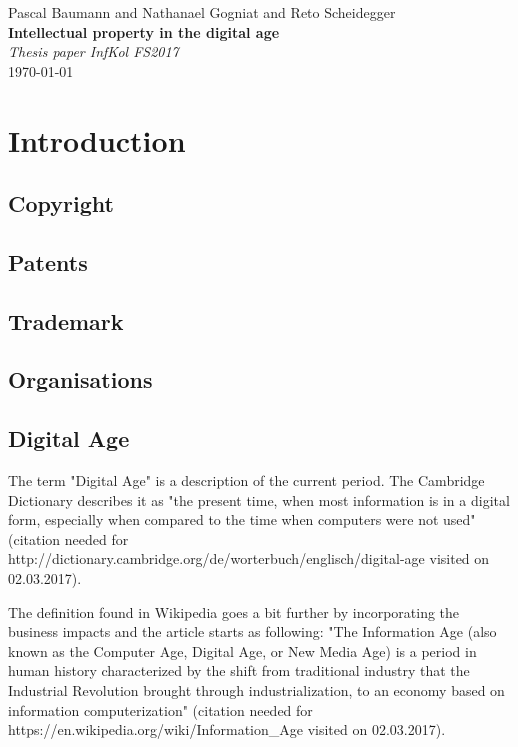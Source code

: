 \documentclass[a4paper]{report}
\newcommand*{\titleAP}{\begingroup %
	\centering
	\vspace*{\baselineskip} %
	
	{\Large Pascal Baumann} and {\Large Nathanael Gogniat} and {\Large Reto Scheidegger}\\[0.167\textheight] %
	
	{\Huge\bfseries Intellectual property in the digital age}\\[\baselineskip]
	
	{\Large \textit{Thesis paper InfKol FS2017}}\\
	\today
	
	\vspace*{3\baselineskip} %
	\endgroup}
\begin{document}
\titleAP

\begin{abstract}
	\blindtext
\end{abstract}
\newpage

\tableofcontents

\newpage

\chapter{Introduction}
\label{ch:Intro}

\section{Copyright}
\label{sec:Copyright}

\section{Patents}
\label{sec:Patents}

\section{Trademark}
\label{sec:Trademark}

\section{Organisations}
\label{sec:Orgas}

\section{Digital Age}
\label{sec:Digital age}
The term "Digital Age" is a description of the current period. The Cambridge Dictionary describes it as "the present time, when most information is in a digital form, especially when compared to the time when computers were not used" (citation needed for http://dictionary.cambridge.org/de/worterbuch/englisch/digital-age visited on 02.03.2017).
 
The definition found in Wikipedia goes a bit further by incorporating the business impacts and the article starts as following: "The Information Age (also known as the Computer Age, Digital Age, or New Media Age) is a period in human history characterized by the shift from traditional industry that the Industrial Revolution brought through industrialization, to an economy based on information computerization" (citation needed for https://en.wikipedia.org/wiki/Information\_Age visited on 02.03.2017).
   
\end{document}
